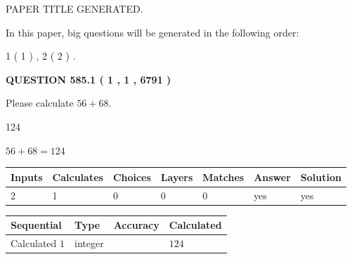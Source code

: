 \documentclass[12pt]{article}
\begin{document}
 
 
 
   
   
 PAPER TITLE GENERATED.
   
   
   
\vspace{0.2in}
   
In this paper, big questions will be generated in the following order: 
   
   
   1 ( 1 )
 ,
   2 ( 2 )
 .
  
\vspace{0.2in}
  
{\textbf{\Large{QUESTION
585.1 
 ( 1 , 1 , 6791 )
}}}
  
  
 
Please calculate $ %
56 +  %
68 $.
 
 
 
\noindent{}
 
 

124
 
 
\noindent{}
 
 

 
 
 
\noindent{}
 
 

$ %
56 +  %
68=   %
124$
 
 
\noindent{}
 
 

 
   
   
   
   
\noindent\begin{tabular}{|l|l|l|l|l|l|l|}
 \hline
Inputs & Calculates & Choices & Layers & Matches & Answer & Solution \\ \hline
 2  & 
 1  & 
 0
  & 
 0  & 
 0  & 
  yes & 
  yes 
  \\ \hline
 \end{tabular}
   
   
   
   
\noindent{}
   
   
  
  
\noindent\begin{tabular}{|l|l|l|l|}
\hline
 Sequential & Type & Accuracy & Calculated \\ 
\hline
 
 
  Calculated $  1 $ & integer &  & 
  $ 124 $ 
 \\  \hline  
 \end{tabular}
   
\end{document}
